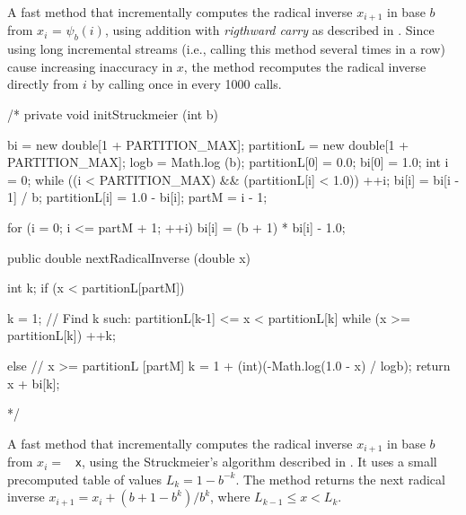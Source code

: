  \begin{tabb}
   A fast method that incrementally computes the radical inverse $x_{i+1}$ 
   in base $b$ from $x_i$ = $\psi_b(i)$,
   using addition with {\em rigthward carry} as described in
 .
   Since using long incremental streams (i.e., calling this method several
   times in a row) cause increasing inaccuracy in $x$, the method
   recomputes the radical inverse directly from $i$ by calling
    once in every 1000 calls.
 \end{tabb}
\begin{htmlonly}
\end{htmlonly}
\begin{hide}
\begin{code}  
/*
   private void initStruckmeier (int b) {
      bi = new double[1 + PARTITION_MAX];
      partitionL = new double[1 + PARTITION_MAX];
      logb = Math.log (b);
      partitionL[0] = 0.0;
      bi[0] = 1.0;
      int i = 0;
      while ((i < PARTITION_MAX) && (partitionL[i] < 1.0)) {
         ++i;
         bi[i] = bi[i - 1] / b;
         partitionL[i] = 1.0 - bi[i];
      }
      partM = i - 1;

      for (i = 0; i <= partM + 1; ++i)
         bi[i] = (b + 1) * bi[i] - 1.0;
   }

   public double nextRadicalInverse (double x) {
      int k;
      if (x < partitionL[partM]) {
         k = 1;
         // Find k such:    partitionL[k-1] <= x < partitionL[k]  
         while (x >= partitionL[k])
            ++k;

      } else {           // x >= partitionL [partM]
         k = 1 + (int)(-Math.log(1.0 - x) / logb);
      }
      return x + bi[k];
   } */
\end{code}
 \begin{tabb}
    A fast method that incrementally computes the radical inverse $x_{i+1}$ 
    in base $b$ from $x_i =$ \texttt{ x}, 
    using the Struckmeier's algorithm described in  \cite{rSTR95a}. It uses
    a small precomputed table of values $L_k = 1 - b^{-k}$. The method returns
    the next radical inverse $x_{i+1} = x_i + (b + 1 - b^k) / b^k$, where
    $L_{k-1} \le x < L_k$. 
 \end{tabb}
\begin{htmlonly}
\end{htmlonly}
\end{hide}
